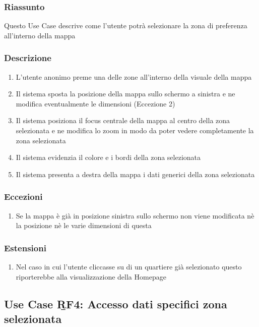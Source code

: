         \subsubsection{Riassunto}
            Questo Use Case descrive come l'utente potrà selezionare la zona di preferenza all'interno della mappa
        \subsubsection{Descrizione}
            \begin{enumerate}
                \item L'utente anonimo preme una delle zone all'interno della visuale della mappa
                \item Il sistema sposta la posizione della mappa sullo schermo a sinistra e ne modifica eventualmente le dimensioni (Eccezione 2)
                \item Il sistema posiziona il focus centrale della mappa al centro della zona selezionata e ne modifica lo zoom in modo da poter vedere completamente la zona selezionata
                \item Il sistema evidenzia il colore e i bordi della zona selezionata
                \item Il sistema presenta a destra della mappa i dati generici della zona selezionata
            \end{enumerate}
        \subsubsection{Eccezioni}
            \begin{enumerate}
                \item Se la mappa è già in posizione sinistra sullo schermo non viene modificata nè la posizione nè le varie dimensioni di questa
            \end{enumerate}
        \subsubsection{Estensioni}
            \begin{enumerate}
                \item Nel caso in cui l'utente cliccasse su di un quartiere già selezionato questo riporterebbe alla visualizzazione della Homepage
            \end{enumerate}

    \subsection{Use Case \b{RF4}: Accesso dati specifici zona selezionata}
